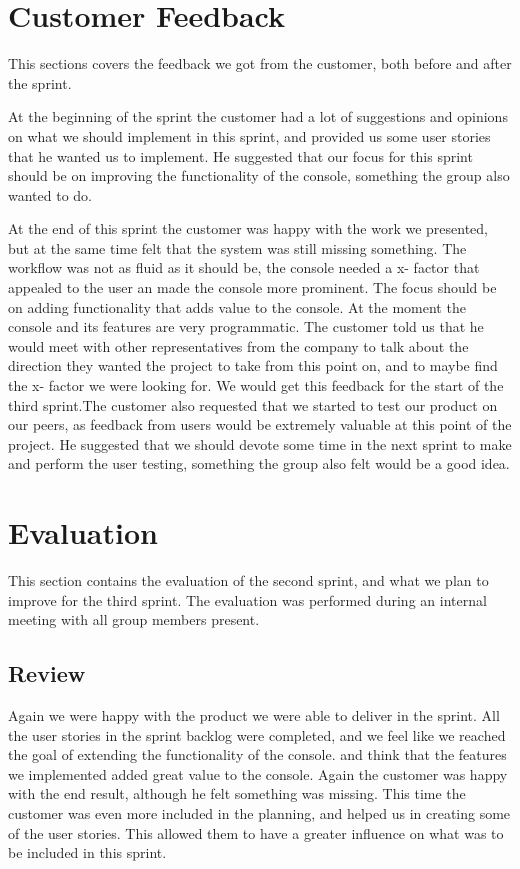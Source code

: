 \section{Customer Feedback}
This sections covers the feedback we got from the customer, both before and after the sprint.

At the beginning of the sprint the customer had a lot of suggestions and opinions on what we should implement in this sprint, and provided us some user stories that he wanted us to implement. He suggested that our focus for this sprint should be on improving the functionality of the console, something the group also wanted to do. 

At the end of this sprint the customer was happy with the work we presented, but at the same time felt that the system was still missing something. The workflow was not as fluid as it should be, the console needed a x- factor that appealed to the user an made the console more prominent. The focus should be on adding functionality that adds value to the console. At the moment the console and its features are very programmatic. The customer told us that he would meet with other representatives from the company to talk about the direction they wanted the project to take from this point on, and to maybe find the x- factor we were looking for. We would get this feedback for the start of the third sprint.The customer also requested that we started to test our product on our peers, as feedback from users would be extremely valuable at this point of the project. He suggested that we should devote some time in the next sprint to make and perform the user testing, something the group also felt would be a good idea.

\section{Evaluation}
This section contains the evaluation of the second sprint, and what we plan to improve for the third sprint. The evaluation was performed during an internal meeting with all group members present.

\subsection{Review}

Again we were happy with the product we were able to deliver in the sprint. All the user stories in the sprint backlog were completed, and we feel like we reached the goal of extending the functionality of the console. and think that the features we implemented added great value to the console. Again the customer was happy with the end result, although he felt something was missing. This time the customer was even more included in the planning, and helped us in creating some of the user stories. This allowed them to have a greater influence on what was to be included in this sprint.

